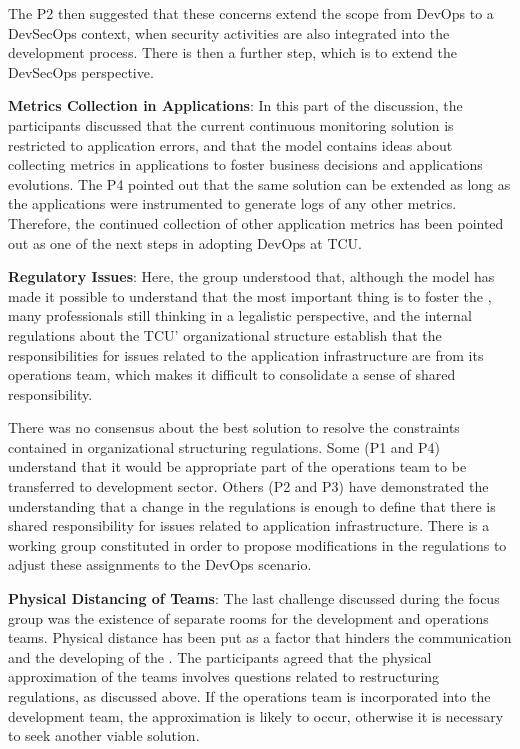 {The P2 then suggested that these concerns extend the scope from DevOps to a
DevSecOps context, when security activities are also integrated into the
development process. There is then a further step, which is to extend the
DevSecOps perspective.

\textbf{Metrics Collection in Applications}:
In this part of the discussion, the participants discussed that the current
continuous monitoring solution is restricted to application errors, and that
the model contains ideas about collecting metrics in applications to foster
business decisions and applications evolutions. The P4 pointed out that the same
solution can be extended as long as the applications were instrumented to
generate logs of any other metrics. Therefore, the continued collection of
other application metrics has been pointed out as one of the next steps in
adopting DevOps at TCU.

\textbf{Regulatory Issues}:
Here, the group understood that, although the model has made it possible to
understand that the most important thing is to foster the \cc, many professionals
still thinking in a legalistic perspective, and the internal regulations about
the TCU' organizational structure establish that the responsibilities for issues
related to the application infrastructure are from its operations team,
which makes it difficult to consolidate a sense of shared responsibility.

There was no consensus about the best solution to resolve the constraints
contained in organizational structuring regulations. Some (P1 and P4) understand
that it would be appropriate part of the operations team to be transferred to
development sector. Others (P2 and P3) have demonstrated the understanding that
a change in the regulations is enough to define that there is shared
responsibility for issues related to application infrastructure. There is a
working group constituted in order to propose modifications in the regulations
to adjust these assignments to the DevOps scenario.

\textbf{Physical Distancing of Teams}:
The last challenge discussed during the focus group was the existence of
separate rooms for the development and operations teams. Physical distance has
been put as a factor that hinders the communication and the developing of
the \cc. The participants agreed that the physical approximation of the teams
involves questions related to restructuring regulations, as discussed above. If
the operations team is incorporated into the development team, the approximation
is likely to occur, otherwise it is necessary to seek another viable solution.
}


